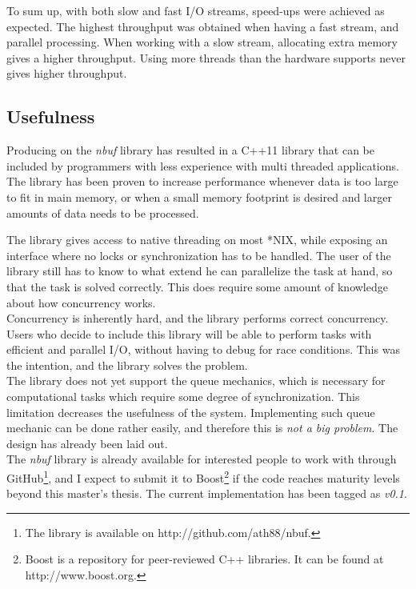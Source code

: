 \documentclass[a4paper]{article}
\newcommand{\nbuf}{\textit{nbuf} }
\begin{document}
To sum up, with both slow and fast I/O streams, speed-ups were achieved as expected. The highest throughput was obtained when having a fast stream, and parallel processing. When working with a slow stream, allocating extra memory gives a higher throughput. Using more threads than the hardware supports never gives higher throughput.


\subsection{Usefulness}
Producing on the \nbuf library has resulted in a C++11 library that can be included by programmers with less experience with multi threaded applications. The library has been proven to increase performance whenever data is too large to fit in main memory, or when a small memory footprint is desired and larger amounts of data needs to be processed.

The library gives access to native threading on most *NIX, while exposing an interface where no locks or synchronization has to be handled. The user of the library still has to know to what extend he can parallelize the task at hand, so that the task is solved correctly. This does require some amount of knowledge about how concurrency works.\\

Concurrency is inherently hard, and the library performs correct concurrency. Users who decide to include this library will be able to perform tasks with efficient and parallel I/O, without having to debug for race conditions. This was the intention, and the library solves the problem.\\

The library does not yet support the queue mechanics, which is necessary for computational tasks which require some degree of synchronization. This limitation decreases the usefulness of the system. Implementing such queue mechanic can be done rather easily, and therefore this is \textit{not a big problem}. The design has already been laid out.\\

The \nbuf library is already available for interested people to work with through GitHub\footnote{The library is available on http://github.com/ath88/nbuf.}, and I expect to submit it to Boost\footnote{Boost is a repository for peer-reviewed C++ libraries. It can be found at http://www.boost.org.} if the code reaches maturity levels beyond this master's thesis. The current implementation has been tagged as \textit{v0.1}.
\end{document}
